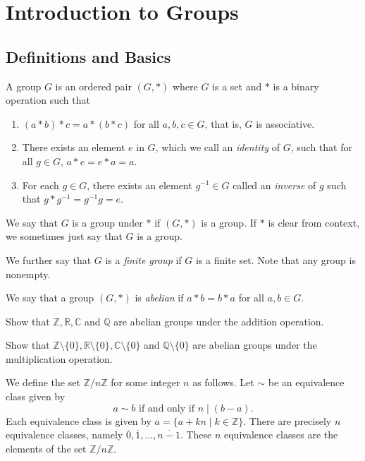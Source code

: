 \section{Introduction to Groups}
    
\subsection{Definitions and Basics}

\begin{definition}
    A group $G$ is an ordered pair $(G,*)$ where $G$ is a set and $*$ is a binary operation such that
    \begin{enumerate}
        \item $(a*b)*c=a*(b*c)$ for all $a,b,c\in G$, that is, $G$ is associative.
        \item There exists an element $e$ in $G$, which we call an \textit{identity} of $G$, such that for all $g\in G$, $a*e=e*a=a$.
        \item For each $g\in G$, there exists an element $g^{-1}\in G$ called an \textit{inverse} of $g$ such that $g*g^{-1}=g^{-1}g=e$.
    \end{enumerate}
\end{definition}

We say that $G$ is a group under $*$ if $(G,*)$ is a group. If $*$ is clear from context, we sometimes just say that $G$ is a group.

We further say that $G$ is a \textit{finite group} if $G$ is a finite set. Note that any group is nonempty.

\begin{definition}
    We say that a group $(G,*)$ is \textit{abelian} if $a*b=b*a$ for all $a,b\in G$.
\end{definition}

\begin{exercise}
    Show that $\mathbb{Z}, \mathbb{R}, \mathbb{C}$ and $\mathbb{Q}$ are abelian groups under the addition operation.
\end{exercise}
\begin{exercise}
    Show that $\mathbb{Z}\setminus\{0\}, \mathbb{R}\setminus\{0\}, \mathbb{C}\setminus\{0\}$ and $\mathbb{Q}\setminus\{0\}$ are abelian groups under the multiplication operation.
\end{exercise}

We define the set $\mathbb{Z}/n\mathbb{Z}$ for some integer $n$ as follows. Let $\sim$ be an equivalence class given by
$$a\sim b\text{ if and only if }n\mid (b-a).$$
Each equivalence class is given by $\overline{a}=\{a+kn\mid k\in\mathbb{Z}\}$. There are precisely $n$ equivalence classes, namely $\overline{0}, \overline{1}, \ldots, \overline{n-1}$. These $n$ equivalence classes are the elements of the set $\mathbb{Z}/n\mathbb{Z}$.

